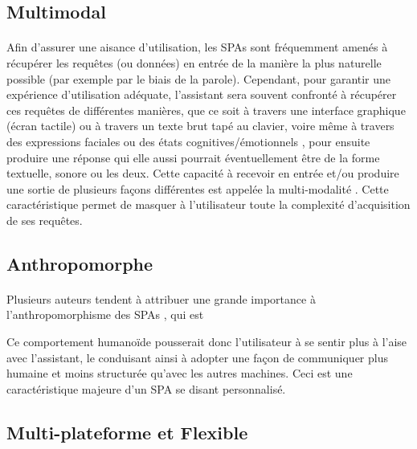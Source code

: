 \subsection{Multimodal}
\paragraph{}
Afin d'assurer une aisance d'utilisation, les SPAs sont fréquemment amenés à récupérer les requêtes (ou données) en entrée de la manière la plus naturelle possible (par exemple par le biais de la parole). Cependant, pour garantir une expérience d'utilisation adéquate, l'assistant sera souvent confronté à récupérer ces requêtes de différentes manières, que ce soit à travers une interface graphique (écran tactile) ou à travers un texte brut tapé au clavier, voire même à travers des expressions faciales ou des états cognitives/émotionnels \cite{Dingler2016}, pour ensuite produire une réponse qui elle aussi pourrait éventuellement être de la forme textuelle, sonore ou les deux. Cette capacité à recevoir en entrée et/ou produire une sortie de plusieurs façons différentes est appelée la multi-modalité \cite{Luger2016}. Cette caractéristique permet de masquer à l'utilisateur toute la complexité d'acquisition de ses requêtes.

\subsection{Anthropomorphe}\label{antropo}
\paragraph{}
Plusieurs auteurs tendent à attribuer une grande importance à l'anthropomorphisme des SPAs \cite{virtualbutler}, qui est 
\begin{quote}
	\cite{alexabff}
\end{quote}

\par Ce comportement humanoïde pousserait donc l'utilisateur à se sentir plus à l'aise avec l'assistant, le conduisant ainsi à adopter une façon de communiquer plus humaine et moins structurée qu'avec les autres machines. Ceci est une caractéristique majeure d'un SPA se disant personnalisé.
\subsection{Multi-plateforme et Flexible }
